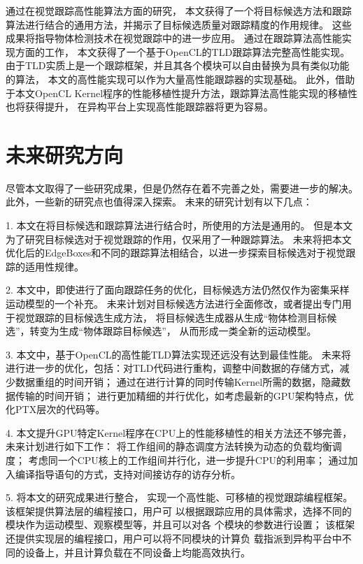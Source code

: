 通过在视觉跟踪高性能算法方面的研究，
本文获得了一个将目标候选方法和跟踪算法进行结合的通用方法，并揭示了目标候选质量对跟踪精度的作用规律。
这些成果将指导物体检测技术在视觉跟踪中的进一步应用。
通过在跟踪算法高性能实现方面的工作，
本文获得了一个基于OpenCL的TLD跟踪算法完整高性能实现。
由于TLD实质上是一个跟踪框架，并且其各个模块可以自由替换为具有类似功能的算法，
本文的高性能实现可以作为大量高性能跟踪器的实现基础。
此外，借助于本文OpenCL Kernel程序的性能移植性提升方法，跟踪算法高性能实现的移植性也将获得提升，
在异构平台上实现高性能跟踪器将更为容易。

\section{未来研究方向}
尽管本文取得了一些研究成果，但是仍然存在着不完善之处，需要进一步的解决。
此外，一些新的研究点也值得深入探索。
未来的研究计划有以下几点：
\begin{compactitem}
\item[1.]
本文在将目标候选和跟踪算法进行结合时，所使用的方法是通用的。
但是本文为了研究目标候选对于视觉跟踪的作用，仅采用了一种跟踪算法。
未来将把本文优化后的EdgeBoxes和不同的跟踪算法相结合，以进一步探索目标候选对于视觉跟踪的适用性规律。

\item[2.]
本文中，即使进行了面向跟踪任务的优化，目标候选方法仍然仅作为密集采样运动模型的一个补充。
未来计划对目标候选方法进行全面修改，或者提出专门用于视觉跟踪的目标候选生成方法，
将目标候选生成器从生成``物体检测目标候选''，转变为生成``物体跟踪目标候选''，
从而形成一类全新的运动模型。

\item[3.]	
本文中，基于OpenCL的高性能TLD算法实现还远没有达到最佳性能。
未来将进行进一步的优化，包括：对TLD代码进行重构，调整中间数据的存储方式，减少数据重组的时间开销；
通过在进行计算的同时传输Kernel所需的数据，隐藏数据传输的时间开销；
进行更加精细的并行优化，如考虑最新的GPU架构特点，优化PTX层次的代码等。

\item[4.]	
本文提升GPU特定Kernel程序在CPU上的性能移植性的相关方法还不够完善，
未来计划进行如下工作：
将工作组间的静态调度方法转换为动态的负载均衡调度；
考虑同一个CPU核上的工作组间并行化，进一步提升CPU的利用率；
通过加入编译指导语句的方式，支持对间接访存的访存分析。

\item[5.]	
将本文的研究成果进行整合，
实现一个高性能、可移植的视觉跟踪编程框架。
该框架提供算法层的编程接口，用户可
以根据跟踪应用的具体需求，选择不同的模块作为运动模型、观察模型等，并且可以对各
个模块的参数进行设置；
该框架还提供实现层的编程接口，用户可以将不同模块的计算负
载指派到异构平台中不同的设备上，并且计算负载在不同设备上均能高效执行。
\end{compactitem}

